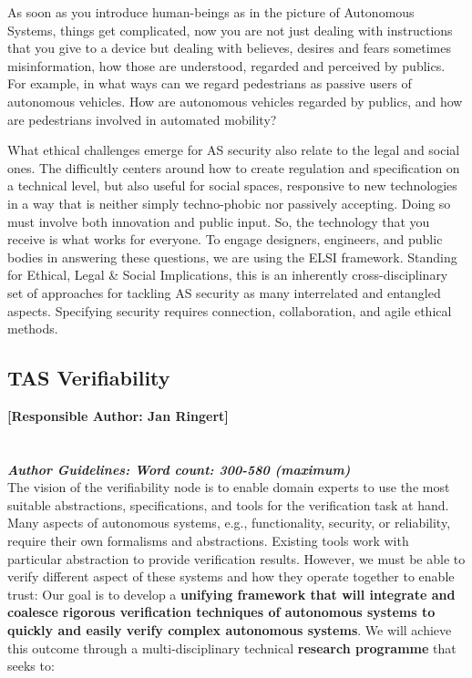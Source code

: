 \documentclass[sigconf]{acmart}
\begin{document}
As soon as you introduce human-beings as in the picture of Autonomous Systems, things get complicated, now you are not just dealing with instructions that you give to a device but dealing with believes, desires and fears sometimes misinformation, how those are understood, regarded and perceived by publics. For example, in what ways can we regard pedestrians as passive users of autonomous vehicles. How are autonomous vehicles regarded by publics, and how are pedestrians involved in automated mobility?

What ethical challenges emerge for AS security also relate to the legal and social ones. The difficultly centers around how to create regulation and specification on a technical level, but also useful for social spaces, responsive to new technologies in a way that is neither simply techno-phobic nor passively accepting. Doing so must involve both innovation and public input. So, the technology that you receive is what works for everyone. To engage designers, engineers, and public bodies in answering these questions, we are using the ELSI framework. Standing for Ethical, Legal \& Social Implications, this is an inherently cross-disciplinary set of approaches for tackling AS security as many interrelated and entangled aspects. Specifying security requires connection, collaboration, and agile ethical methods.

\subsection{TAS Verifiability}
\noindent\textbf{[Responsible Author:  Jan Ringert]}\\
\\\\
\noindent\textbf{\textit{Author Guidelines: Word count: 300-580 (maximum)}}\\

The vision of the verifiability node is to enable domain experts to use the most suitable abstractions, specifications, and tools for the verification task at hand. 
Many aspects of autonomous systems, e.g., functionality, security, or reliability, require their own formalisms and abstractions. Existing tools work with particular abstraction to provide verification results. 
However, we must be able to verify different aspect of these systems and how they operate together to enable trust:
Our goal is to develop a \textbf{unifying framework that will integrate and coalesce rigorous verification techniques of autonomous systems to quickly and easily verify complex autonomous systems}. 
We will achieve this outcome through a multi-disciplinary technical \textbf{research  programme} that seeks to: 
\end{document}

